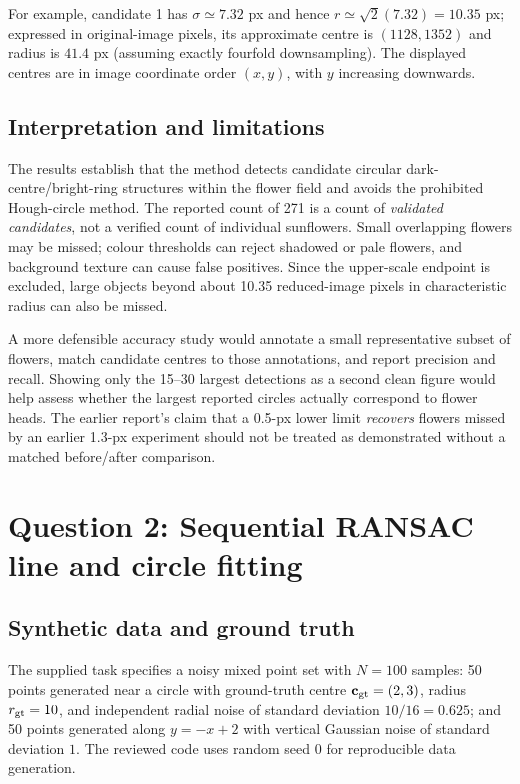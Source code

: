 \documentclass[11pt,a4paper]{article}
\begin{document}
For example, candidate 1 has $\sigma\simeq7.32$ px and hence $r\simeq\sqrt{2}(7.32)=10.35$ px; expressed in original-image pixels, its approximate centre is $(1128,1352)$ and radius is $41.4$ px (assuming exactly fourfold downsampling). The displayed centres are in image coordinate order $(x,y)$, with $y$ increasing downwards.

\subsection{Interpretation and limitations}
The results establish that the method detects candidate circular dark-centre/bright-ring structures within the flower field and avoids the prohibited Hough-circle method. The reported count of 271 is a count of \emph{validated candidates}, not a verified count of individual sunflowers. Small overlapping flowers may be missed; colour thresholds can reject shadowed or pale flowers, and background texture can cause false positives. Since the upper-scale endpoint is excluded, large objects beyond about 10.35 reduced-image pixels in characteristic radius can also be missed.

A more defensible accuracy study would annotate a small representative subset of flowers, match candidate centres to those annotations, and report precision and recall. Showing only the 15--30 largest detections as a second clean figure would help assess whether the largest reported circles actually correspond to flower heads. The earlier report's claim that a 0.5-px lower limit \emph{recovers} flowers missed by an earlier 1.3-px experiment should not be treated as demonstrated without a matched before/after comparison.

\section{Question 2: Sequential RANSAC line and circle fitting}
\subsection{Synthetic data and ground truth}
The supplied task specifies a noisy mixed point set with $N=100$ samples: 50 points generated near a circle with ground-truth centre $\mathbf{c}_{\rm gt}=(2,3)$, radius $r_{\rm gt}=10$, and independent radial noise of standard deviation $10/16=0.625$; and 50 points generated along $y=-x+2$ with vertical Gaussian noise of standard deviation $1$. The reviewed code uses random seed 0 for reproducible data generation.
\end{document}
